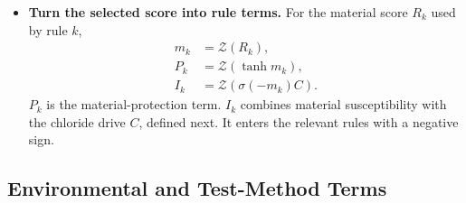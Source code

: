 \documentclass[11pt]{article}
\newenvironment{notes}
  {\begin{itemize}\setlength{\itemsep}{0.45em}\setlength{\parsep}{0pt}}
  {\end{itemize}}
\begin{document}
\begin{notes}
    \item \textbf{Turn the selected score into rule terms.}
    For the material score \(R_k\) used by rule \(k\),
    \begin{equation}
    \begin{aligned}
        m_k&=\mathcal{Z}(R_k),\\
        P_k&=\mathcal{Z}(\tanh m_k),\\
        I_k&=\mathcal{Z}\!\left(\sigma(-m_k)C\right).
    \end{aligned}
    \label{eq:rule-material-signals}
    \end{equation}
    \(P_k\) is the material-protection term.
    \(I_k\) combines material susceptibility with the chloride
    drive \(C\), defined next. It enters the relevant rules
    with a negative sign.
\end{notes}

\subsection{Environmental and Test-Method Terms}
\label{sec:analytical-environment-terms}
\end{document}
